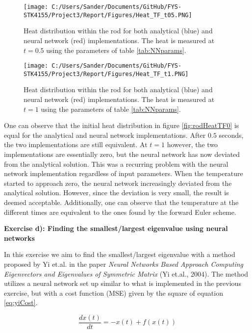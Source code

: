 \documentclass[12pt,a4paper]{article}
\begin{document}
\begin{figure}[H]
\centering
\texttt{[image: C:/Users/Sander/Documents/GitHub/FYS-STK4155/Project3/Report/Figures/Heat\_TF\_t05.PNG]}
\caption{\label{fig:rodHeatTF05} Heat distribution within the rod for both analytical (blue) and neural network (red) implementations. The heat is measured at $t = 0.5$ using the parameters of table \ref{tab:NNparams}.}
\end{figure}

\begin{figure}[H]
\centering
\texttt{[image: C:/Users/Sander/Documents/GitHub/FYS-STK4155/Project3/Report/Figures/Heat\_TF\_t1.PNG]}
\caption{\label{fig:rodHeatTF1} Heat distribution within the rod for both analytical (blue) and neural network (red) implementations. The heat is measured at $t = 1$ using the parameters of table \ref{tab:NNparams}.}
\end{figure}

\noindent One can observe that the initial heat distribution in figure \ref{fig:rodHeatTF0} is equal for the analytical and neural network implementations. After $0.5$ seconds, the two implementations are still equivalent. At $t = 1$ however, the two implementations are essentially zero, but the neural network has now deviated from the analytical solution. This was a recurring problem with the neural network implementation regardless of input parameters. When the temperature started to approach zero, the neural network increasingly deviated from the analytical solution. However, since the deviation is very small, the result is deemed acceptable. Additionally, one can observe that the temperature at the different times are equivalent to the ones found by the forward Euler scheme.

\newpage

\begin{center}
\Large{\textbf{Exercise d): Finding the smallest/largest eigenvalue using neural networks}}
\end{center}

\noindent In this exercise we aim to find the smallest/largest eigenvalue with a method proposed by Yi et.al. in the paper \emph{Neural Networks Based Approach Computing Eigenvectors and Eigenvalues of Symmetric Matrix} (Yi et.al., 2004). The method utilizes a neural network set up similar to what is implemented in the previous exercise, but with a cost function (MSE) given by the square of equation \ref{eq:yiCost}.

\begin{equation}\label{eq:yiCost}
\frac{d x(t)}{dt} = -x(t) + f(x(t))
\end{equation}
\end{document}
